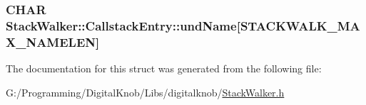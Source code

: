\hypertarget{struct_stack_walker_1_1_callstack_entry_a35b6b8892cfd374d6e8706f8d54461f9}{
\subsubsection[{und\-Name}]{\setlength{\rightskip}{0pt plus 5cm}C\-H\-A\-R Stack\-Walker\-::\-Callstack\-Entry\-::und\-Name\mbox{[}{\bf S\-T\-A\-C\-K\-W\-A\-L\-K\-\_\-\-M\-A\-X\-\_\-\-N\-A\-M\-E\-L\-E\-N}\mbox{]}}}\label{struct_stack_walker_1_1_callstack_entry_a35b6b8892cfd374d6e8706f8d54461f9}


The documentation for this struct was generated from the following file\-:\begin{DoxyCompactItemize}
\item 
G\-:/\-Programming/\-Digital\-Knob/\-Libs/digitalknob/\hyperlink{_stack_walker_8h}{Stack\-Walker.\-h}\end{DoxyCompactItemize}
